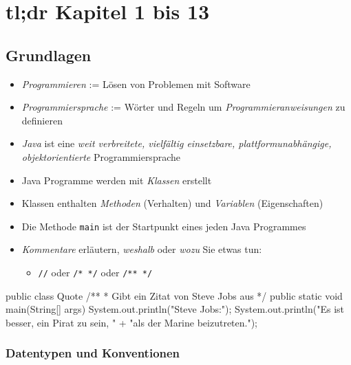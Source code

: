 \documentclass[a4paper,10pt, dvipsnames]{report}
\newcommand{\javaInLine}[1]{\texttt{#1}}
\begin{document}
\chapter{tl;dr Kapitel 1 bis 13}

\section{Grundlagen}

\begin{itemize}
	\item \textit{Programmieren} := Lösen von Problemen mit Software
	\item \textit{Programmiersprache} := Wörter und Regeln um \textit{Programmieranweisungen} zu definieren
	\item \textit{Java} ist eine \textit{weit verbreitete, vielfältig einsetzbare, plattformunabhängige, objektorientierte} Programmiersprache
	\item Java Programme werden mit \textit{Klassen} erstellt
	\item Klassen enthalten \textit{Methoden} (Verhalten) und \textit{Variablen} (Eigenschaften)
	\item Die Methode \javaInLine{main} ist der Startpunkt eines jeden Java Programmes
	\item \textit{Kommentare} erläutern, \textit{weshalb} oder \textit{wozu} Sie etwas tun:
	\begin{itemize}
        \item \javaInLine{//} oder \javaInLine{/* */} oder \javaInLine{/** */}
    \end{itemize}
\end{itemize}

\begin{javacodebox}
    public class Quote {
        /**
        * Gibt ein Zitat von Steve Jobs aus
        */
        public static void main(String[] args) {
            System.out.println("Steve Jobs:");
            System.out.println("Es ist besser, ein Pirat zu sein, "
                         + "als der Marine beizutreten.");
    }
}
\end{javacodebox}

\subsection{Datentypen und Konventionen}
\end{document}
